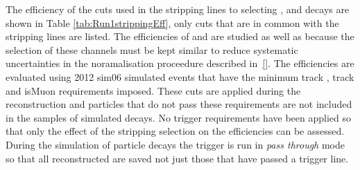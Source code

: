 The efficiency of the cuts used in the stripping lines to selecting \bmumu, \bhh and \bujpsik decays are shown in Table \ref{tab:Run1strippingEff}, only cuts that are in common with the \bmumu stripping lines are listed. The efficiencies of \bhh and \bujpsik are studied as well as \bmumu because the selection of these channels must be kept similar to reduce systematic uncertainties in the noramalisation proceedure described in~\ref{}. The efficiencies are evaluated using 2012 sim06 simulated events that have the minimum track \pt, track \chisqd and isMuon requirements imposed. These cuts are applied during the reconstruction and particles that do not pass these requirements are not included in the samples of simulated decays. No trigger requirements have been applied so that only the effect of the stripping selection on the efficiencies can be assessed. During the simulation of particle decays the trigger is run in {\it pass through} mode so that all reconstructed are saved not just those that have passed a trigger line. 


